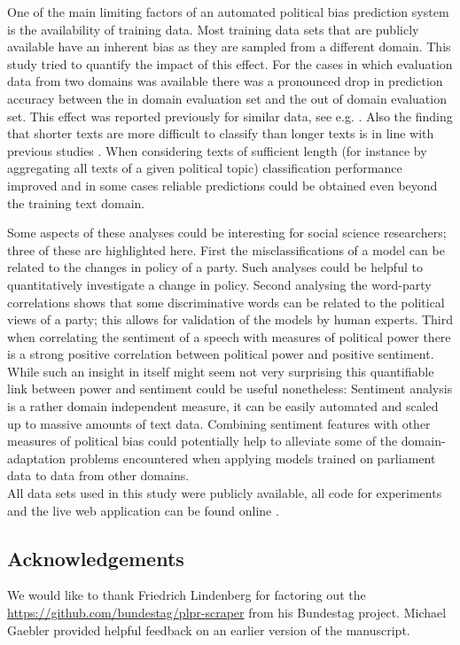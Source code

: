 \documentclass[11pt]{article}
\begin{document}
One of the main limiting factors of an automated political bias prediction system is the availability of training data. Most training data sets that are publicly available have an inherent bias as they are sampled from a different domain. This study tried to quantify the impact of this effect.
For the cases in which evaluation data from two domains was available there was a pronounced drop in prediction accuracy between the in domain evaluation set and the out of domain evaluation set. This effect was reported previously for similar data, see e.g. \cite{Yu2008}. Also the finding that shorter texts are more difficult to classify than longer texts is in line with previous studies \cite{Hirst2014}. When considering texts of sufficient length (for instance by aggregating all texts of a given political topic) classification performance improved and in some cases reliable predictions could be obtained even beyond the training text domain.

Some aspects of these analyses could be interesting for social science researchers; three of these are highlighted here.
First the misclassifications of a model can be related to the changes in policy of a party. Such analyses could be helpful to quantitatively investigate a change in policy. Second analysing the word-party correlations shows that some discriminative words can be related to the political views of a party; this allows for validation of the models by human experts. Third when correlating the sentiment of a speech with measures of political power there is a strong positive correlation between political power and positive sentiment. While such an insight in itself might seem not very surprising this quantifiable link between power and sentiment could be useful nonetheless: Sentiment analysis is a rather domain independent measure, it can be easily automated and scaled up to massive amounts of text data. Combining sentiment features with other measures of political bias could potentially help to alleviate some of the domain-adaptation problems encountered when applying models trained on parliament data to data from other domains. \\


All data sets used in this study were publicly available, all code for experiments and the live web application can be found online \cite{fipi, fipidemo}.

\subsection*{Acknowledgements}
We would like to thank Friedrich Lindenberg for factoring out the \url{https://github.com/bundestag/plpr-scraper} from his Bundestag project. Michael Gaebler provided helpful feedback on an earlier version of the manuscript. \\
%

\newpage
\small{


}
\end{document}
